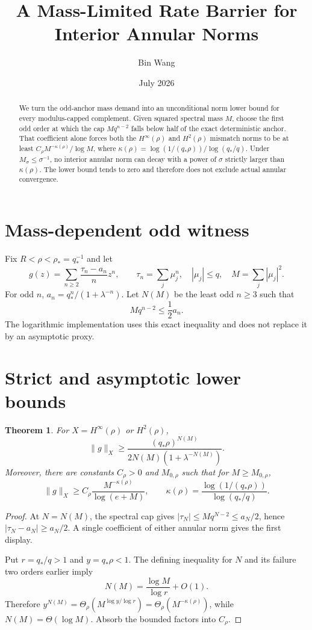 \documentclass[11pt]{article}
\title{A Mass-Limited Rate Barrier for Interior Annular Norms}
\author{Bin Wang}\date{July 2026}
\newtheorem{theorem}{Theorem}[section]
\theoremstyle{remark}\newtheorem{remark}[theorem]{Remark}
\begin{document}
\maketitle
\begin{abstract}
We turn the odd-anchor mass demand into an unconditional norm lower bound for
every modulus-capped complement.  Given squared spectral mass $M$, choose
the first odd order at which the cap $Mq^{n-2}$ falls below half of the exact
deterministic anchor.  That coefficient alone forces both the
$H^\infty(\rho)$ and $H^2(\rho)$ mismatch norms to be at least
$C_\rho M^{-\kappa(\rho)}/\log M$, where
$\kappa(\rho)=\log(1/(q_*\rho))/\log(q_*/q)$.  Under
$M_\sigma\le\sigma^{-1}$, no interior annular norm can decay with a power of
$\sigma$ strictly larger than $\kappa(\rho)$.  The lower bound tends to zero
and therefore does not exclude actual annular convergence.
\end{abstract}

\section{Mass-dependent odd witness}
Fix $R<\rho<\rho_*=q_*^{-1}$ and let
\[
 g(z)=\sum_{n\ge2}\frac{\tau_n-a_n}{n}z^n,
 \qquad
 \tau_n=\sum_j\mu_j^n,\quad |\mu_j|\le q,\quad
 M=\sum_j|\mu_j|^2.
\]
For odd $n$, $a_n=q_*^n/(1+\lambda^{-n})$.  Let $N(M)$ be the least odd
$n\ge3$ such that
\[
 Mq^{n-2}\le\frac12a_n.
\]
The logarithmic implementation uses this exact inequality and does not
replace it by an asymptotic proxy.

\section{Strict and asymptotic lower bounds}
\begin{theorem}\label{thm:lower}
For $X=H^\infty(\rho)$ or $H^2(\rho)$,
\[
 \|g\|_X\ge
 \frac{(q_*\rho)^{N(M)}}
 {2N(M)(1+\lambda^{-N(M)})}.
\]
Moreover, there are constants $C_\rho>0$ and $M_{0,\rho}$ such that for
$M\ge M_{0,\rho}$,
\[
 \boxed{
 \|g\|_X\ge
 C_\rho\frac{M^{-\kappa(\rho)}}{\log(e+M)},
 \qquad
 \kappa(\rho)=
 \frac{\log(1/(q_*\rho))}{\log(q_*/q)}.}
\]
\end{theorem}
\begin{proof}
At $N=N(M)$, the spectral cap gives
$|\tau_N|\le Mq^{N-2}\le a_N/2$, hence
$|\tau_N-a_N|\ge a_N/2$.  A single coefficient of either annular norm gives
the first display.

Put $r=q_*/q>1$ and $y=q_*\rho<1$.  The defining inequality for $N$ and
its failure two orders earlier imply
\[
 N(M)=\frac{\log M}{\log r}+O(1).
\]
Therefore
$y^{N(M)}=\Theta_\rho(M^{\log y/\log r})
=\Theta_\rho(M^{-\kappa(\rho)})$, while
$N(M)=\Theta(\log M)$.  Absorb the bounded factors into $C_\rho$.
\end{proof}
\end{document}

